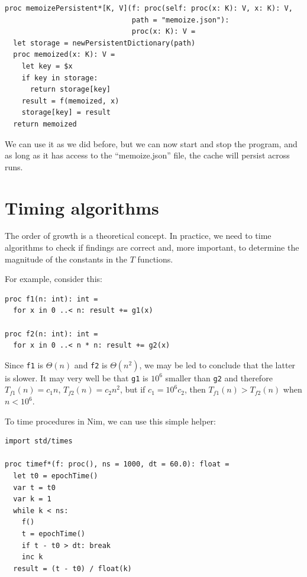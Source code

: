 \documentclass[justified, sixbynine]{tufte-book}
\def\ft{\small\tt}
\theoremstyle{plain}%
\newtheorem * {corollary}{Corollary}
\theoremstyle{definition}
\theoremstyle{remark}
\newtheorem * {remark}{Remark}
\newtheorem * {note}{Note}
\begin{document}
\begin{fullwidth}
\begin{lstlisting}[caption={in file: {\ft nlib/memoize.nim}}]
proc memoizePersistent*[K, V](f: proc(self: proc(x: K): V, x: K): V,
                              path = "memoize.json"):
                              proc(x: K): V =
  let storage = newPersistentDictionary(path)
  proc memoized(x: K): V =
    let key = $x
    if key in storage:
      return storage[key]
    result = f(memoized, x)
    storage[key] = result
  return memoized
\end{lstlisting}

We can use it as we did before, but we can now start and stop the program, and as long as it has access to the ``memoize.json'' file, the cache will persist across runs.

\goodbreak\section{Timing algorithms}

The order of growth is a theoretical concept. In practice, we need to time algorithms to check if findings are correct and, more important, to determine the magnitude of the constants in the $T$ functions.

For example, consider this:
\begin{lstlisting}
proc f1(n: int): int =
  for x in 0 ..< n: result += g1(x)

proc f2(n: int): int =
  for x in 0 ..< n * n: result += g2(x)
\end{lstlisting}

Since {\ft f1} is $\Theta(n)$ and {\ft f2} is $\Theta(n^2)$, we may be led to conclude that the latter is slower. It may very well be that {\ft g1} is $10^6$ smaller than {\ft g2} and therefore $T_{f1}(n) = c_1 n$, $T_{f2}(n) = c_2 n^2$, but if $c_1 = 10^6 c_2$, then $T_{f1}(n) > T_{f2}(n)$ when $n<10^6$.

To time procedures in Nim, we can use this simple helper:

\begin{lstlisting}[caption={in file: {\ft nlib/timer.nim}}]
import std/times

proc timef*(f: proc(), ns = 1000, dt = 60.0): float =
  let t0 = epochTime()
  var t = t0
  var k = 1
  while k < ns:
    f()
    t = epochTime()
    if t - t0 > dt: break
    inc k
  result = (t - t0) / float(k)
\end{lstlisting}


\end{fullwidth}
\end{document}
